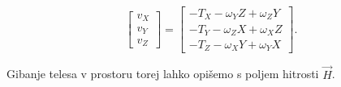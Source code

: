 \begin{equation} \label{eq:gibanje}
	\begin{bmatrix}
	v_X \\ v_Y \\ v_Z
	\end{bmatrix}
    =
    \begin{bmatrix}
    - T_X - \omega_Y Z + \omega_Z Y \\
    - T_Y - \omega_Z X + \omega_X Z \\
    - T_Z - \omega_X Y + \omega_Y X
    \end{bmatrix}.
\end{equation}

Gibanje telesa v prostoru torej lahko opišemo s poljem hitrosti $\vec{H}$.


